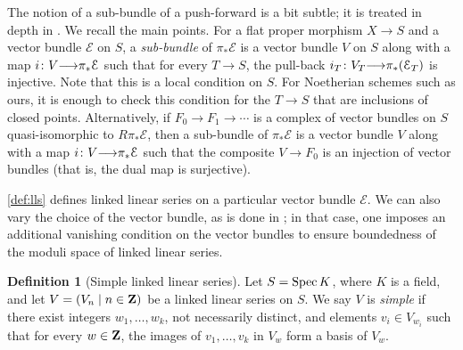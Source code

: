 \documentclass[11pt,reqno]{amsart}
\theoremstyle{plain}
\theoremstyle{definition}
\newtheorem{definition}[theorem]{Definition}
\theoremstyle{remark}
\numberwithin{equation}{section}
\renewcommand{\to}{{\longrightarrow}}
\numberwithin{equation}{section}
\begin{document}
\begin{remark}
The notion of a sub-bundle of a push-forward is a bit subtle; it is treated in depth in \cite[Definition~B.2.1]{oss:14}.
We recall the main points.
For a flat proper morphism $X \to S$ and a vector bundle $\mathcal E$ on $S$, a \emph{sub-bundle} of $\pi_* \mathcal E$ is a vector bundle $V$ on $S$ along with a map $i \from V \to \pi_* \mathcal E$ such that for every $T \to S$, the pull-back $i_T \from V_T \to \pi_* (\mathcal E_T)$ is injective.
Note that this is a local condition on $S$.
For Noetherian schemes such as ours, it is enough to check this condition for the $T \to S$ that are inclusions of closed points.
Alternatively, if $F_0 \to F_1 \to \cdots $ is a complex of vector bundles on $S$ quasi-isomorphic to $R\pi_* \mathcal E$, then a sub-bundle of $\pi_* \mathcal E$ is a vector bundle $V$ along with a map $i \from V \to \pi_* \mathcal E$ such that the composite $V \to F_0$ is an injection of vector bundles (that is, the dual map is surjective).
\end{remark}


\begin{remark}
\autoref{def:lls} defines linked linear series on a particular vector bundle $\mathcal E$.
We can also vary the choice of the vector bundle, as is done in \cite{oss:14}; in that case, one imposes an additional vanishing condition on the vector bundles to ensure boundedness of the moduli space of linked linear series.
\end{remark}


\begin{definition}[Simple linked linear series]
  \label{def:simple_lls}
Let $S = \operatorname{Spec} K$, where $K$ is a field, and let $V = (V_n \mid n \in {\bf Z})$ be a linked linear series on $S$.
We say  $V$ is \emph{simple} if there exist integers $w_1, \dots, w_k$, not necessarily distinct, and elements $v_i \in V_{w_i}$ such that for every $w \in {\bf Z}$, the images of $v_1, \dots, v_k$ in $V_w$ form a basis of $V_w$.
\end{definition}
\end{document}
